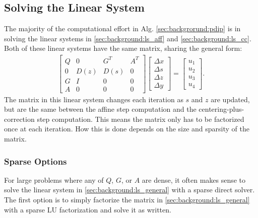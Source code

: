 \subsection{Solving the Linear System}
\label{sec:background:solve_ls}
%
%
The majority of the computational effort in Alg. \ref{sec:backgrorund:pdip} is in solving the linear systems in \eqref{sec:background:ls_aff} and \eqref{sec:background:ls_cc}. Both of these linear systems have the same matrix, sharing the general form:
\begin{align}
    \begin{bmatrix}
        Q & 0 & G^{T} & A^{T} \\
        0 & D(z) & D(s) & 0 \\
        G & I & 0 & 0 \\
        A & 0 & 0 & 0
    \end{bmatrix}
    \begin{bmatrix}
        \Delta x \\
        \Delta s \\
        \Delta z \\
        \Delta y
    \end{bmatrix}
    = \begin{bmatrix}
        u_1 \\ u_2 \\ u_3 \\ u_4
        \end{bmatrix}. \label{sec:background:ls_general}
\end{align}
The matrix in this linear system changes each iteration as $s$ and $z$ are updated, but are the same between the affine step computation and the centering-plus-correction step computation. This means the matrix only has to be factorized once at each iteration. How this is done depends on the size and sparsity of the matrix.
%
\subsubsection{Sparse Options}
%
For large problems where any of $Q$, $G$, or $A$ are dense, it often makes sense to solve the linear system in \eqref{sec:background:ls_general} with a sparse direct solver. The first option is to simply factorize the matrix in \eqref{sec:background:ls_general} with a sparse LU factorization and solve it as written.

